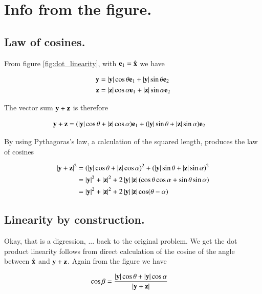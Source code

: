 \section{Info from the figure. }
\subsection{Law of cosines. }

From 
figure \ref{fig:dot_linearity}, with $\Be_1 = \xcap$ we have

\begin{align*}
\By &= \Abs{\By} \cos\theta \Be_1 + \Abs{\By} \sin\theta \Be_2 \\
\Bz &= \Abs{\Bz} \cos\alpha \Be_1 + \Abs{\Bz} \sin\alpha \Be_2
\end{align*}

The vector sum $\By + \Bz$ is therefore

\begin{align*}
\By + \Bz &= (\Abs{\By} \cos\theta + \Abs{\Bz} \cos\alpha )\Be_1 + (\Abs{\By} \sin\theta + \Abs{\Bz} \sin\alpha ) \Be_2
\end{align*}

By using Pythagoras's law, a calculation of the squared length, produces the law of cosines

\begin{align*}
\Abs{\By + \Bz}^2 
&= (\Abs{\By} \cos\theta + \Abs{\Bz} \cos\alpha )^2 + (\Abs{\By} \sin\theta + \Abs{\Bz} \sin\alpha )^2 \\
&= \Abs{\By}^2 + \Abs{\Bz}^2 + 2 \Abs{\By} \Abs{\Bz} (\cos\theta \cos\alpha + \sin\theta \sin\alpha) \\
&= \Abs{\By}^2 + \Abs{\Bz}^2 + 2 \Abs{\By} \Abs{\Bz} \cos(\theta -\alpha) \\
\end{align*}

\subsection{Linearity by construction. }

Okay, that is a digression, ... back to the original problem.  We get the dot product linearity follows from direct calculation
of the cosine of the angle between $\xcap$ and $\By + \Bz$.  Again from the figure we have

\begin{align*}
\cos\beta &= \frac{\Abs{\By}\cos\theta + \Abs{\By}\cos\alpha}{\Abs{\By + \Bz}}
\end{align*}

